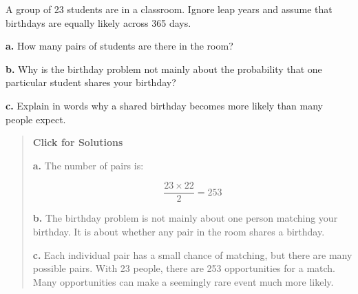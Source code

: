 \documentclass[
  letterpaper,
  DIV=11,
  numbers=noendperiod]{scrreprt}
\begin{document}
\begin{tcolorbox}[enhanced jigsaw, arc=.35mm, bottomrule=.15mm, bottomtitle=1mm, breakable, colback=white, colbacktitle=quarto-callout-note-color!10!white, colframe=quarto-callout-note-color-frame, coltitle=black, left=2mm, leftrule=.75mm, opacityback=0, opacitybacktitle=0.6, rightrule=.15mm, title=\textcolor{quarto-callout-note-color}{\faInfo}\hspace{0.5em}{Question 6}, titlerule=0mm, toprule=.15mm, toptitle=1mm]

A group of 23 students are in a classroom. Ignore leap years and assume
that birthdays are equally likely across 365 days.

\textbf{a.} How many pairs of students are there in the room?

\textbf{b.} Why is the birthday problem not mainly about the probability
that one particular student shares your birthday?

\textbf{c.} Explain in words why a shared birthday becomes more likely
than many people expect.

\begin{quote}
\textbf{Click for Solutions}

\textbf{a.} The number of pairs is:

\[
\frac{23\times 22}{2} = 253
\]

\textbf{b.} The birthday problem is not mainly about one person matching
your birthday. It is about whether any pair in the room shares a
birthday.

\textbf{c.} Each individual pair has a small chance of matching, but
there are many possible pairs. With 23 people, there are 253
opportunities for a match. Many opportunities can make a seemingly rare
event much more likely.
\end{quote}

\end{tcolorbox}
\end{document}
